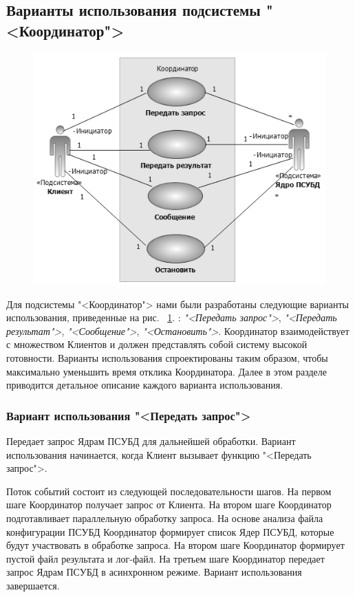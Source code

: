 \documentclass[11pt,oneside]{article}
\begin{document}
	\subsection{Варианты использования подсистемы "<Координатор">}\label{S_CoordinatorUseCases}
	
	\begin{figure}[h]
		\centering
		\includegraphics[width=0.9\linewidth]{coordUCDiagram}
		\caption{}
		\label{fig:coordUCDiagram}
	\end{figure}
	
	Для подсистемы "<Координатор"> нами были разработаны следующие варианты использования, приведенные на рис. ~\ref{fig:coordUCDiagram}.
	: \textit{"<Передать запрос">}, \textit{"<Передать результат">}, \textit{"<Сообщение">}, \textit{"<Остановить">}. Координатор взаимодействует с множеством Клиентов и должен представлять собой систему высокой готовности. Варианты использования спроектированы таким образом, чтобы максимально уменьшить время отклика Координатора. Далее в этом разделе приводится детальное описание каждого варианта использования.
	
	\subsubsection{Вариант использования "<Передать запрос">}
	\par Передает запрос Ядрам ПСУБД для дальнейшей обработки. Вариант использования начинается, когда Клиент вызывает функцию "<Передать запрос">.
	\par Поток событий состоит из следующей последовательности шагов. На первом шаге Координатор получает запрос от Клиента. На втором шаге Координатор подготавливает параллельную обработку запроса. На основе анализа файла конфигурации ПСУБД Координатор формирует список Ядер ПСУБД, которые будут участвовать в обработке запроса. На втором шаге Координатор формирует пустой файл результата и лог-файл. На третьем шаге Координатор передает запрос Ядрам ПСУБД в асинхронном режиме. Вариант использования завершается.
	
\end{document}

